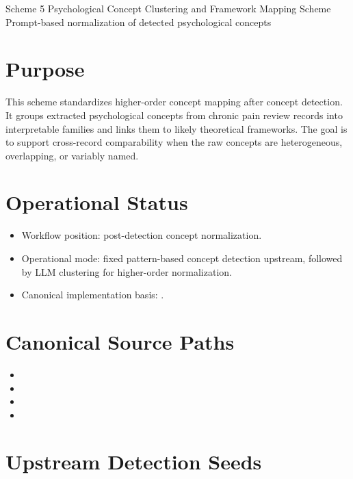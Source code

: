 \documentclass[11pt]{article}
\begin{document}
\schemeheader
  {Scheme 5}
  {Psychological Concept Clustering and Framework Mapping Scheme}
  {Prompt-based normalization of detected psychological concepts}

\section*{Purpose}
This scheme standardizes higher-order concept mapping after concept detection. It groups extracted psychological concepts from chronic pain review records into interpretable families and links them to likely theoretical frameworks. The goal is to support cross-record comparability when the raw concepts are heterogeneous, overlapping, or variably named.

\section*{Operational Status}
\begin{itemize}
\item Workflow position: post-detection concept normalization.
\item Operational mode: fixed pattern-based concept detection upstream, followed by LLM clustering for higher-order normalization.
\item Canonical implementation basis: .
\end{itemize}

\section*{Canonical Source Paths}
\begin{itemize}
\item {}
\item {}
\item {}
\item {}
\end{itemize}

\section*{Upstream Detection Seeds}
\end{document}
